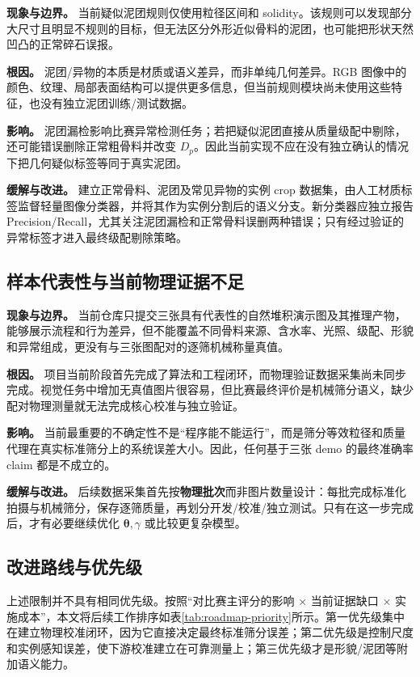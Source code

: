 \textbf{现象与边界。} 当前疑似泥团规则仅使用粒径区间和 solidity。该规则可以发现部分大尺寸且明显不规则的目标，但无法区分外形近似骨料的泥团，也可能把形状天然凹凸的正常碎石误报。

\textbf{根因。} 泥团/异物的本质是材质或语义差异，而非单纯几何差异。RGB 图像中的颜色、纹理、局部表面结构可以提供更多信息，但当前规则模块尚未使用这些特征，也没有独立泥团训练/测试数据。

\textbf{影响。} 泥团漏检影响比赛异常检测任务；若把疑似泥团直接从质量级配中剔除，还可能错误删除正常粗骨料并改变 $D_p$。因此当前实现不应在没有独立确认的情况下把几何疑似标签等同于真实泥团。

\textbf{缓解与改进。} 建立正常骨料、泥团及常见异物的实例 crop 数据集，由人工材质标签监督轻量图像分类器，并将其作为实例分割后的语义分支。新分类器应独立报告 Precision/Recall，尤其关注泥团漏检和正常骨料误删两种错误；只有经过验证的异常标签才进入最终级配剔除策略。

\subsection{样本代表性与当前物理证据不足}
\label{sec:limit-evidence}

\textbf{现象与边界。} 当前仓库只提交三张具有代表性的自然堆积演示图及其推理产物，能够展示流程和行为差异，但不能覆盖不同骨料来源、含水率、光照、级配、形貌和异常组成，更没有与三张图配对的逐筛机械称量真值。

\textbf{根因。} 项目当前阶段首先完成了算法和工程闭环，而物理验证数据采集尚未同步完成。视觉任务中增加无真值图片很容易，但比赛最终评价是机械筛分语义，缺少配对物理测量就无法完成核心校准与独立验证。

\textbf{影响。} 当前最重要的不确定性不是“程序能不能运行”，而是筛分等效粒径和质量代理在真实标准筛分上的系统误差大小。因此，任何基于三张 demo 的最终准确率 claim 都是不成立的。

\textbf{缓解与改进。} 后续数据采集首先按\textbf{物理批次}而非图片数量设计：每批完成标准化拍摄与机械筛分，保存逐筛质量，再划分开发/校准/独立测试。只有在这一步完成后，才有必要继续优化 $\boldsymbol{\theta},\gamma$ 或比较更复杂模型。

\subsection{改进路线与优先级}
\label{sec:roadmap}

上述限制并不具有相同优先级。按照“对比赛主评分的影响 × 当前证据缺口 × 实施成本”，本文将后续工作排序如表\ref{tab:roadmap-priority}所示。第一优先级集中在建立物理校准闭环，因为它直接决定最终标准筛分误差；第二优先级是控制尺度和实例感知误差，使下游校准建立在可靠测量上；第三优先级才是形貌/泥团等附加语义能力。

